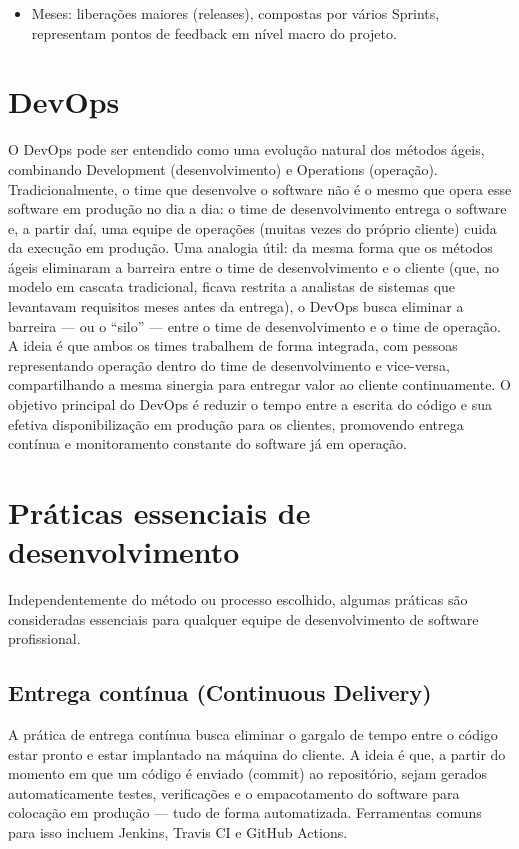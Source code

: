 \begin{itemize}
  \item Meses: liberações maiores (releases), compostas por vários Sprints, representam pontos de feedback em nível macro do projeto.
\end{itemize}

\section{DevOps}

O DevOps pode ser entendido como uma evolução natural dos métodos ágeis, combinando Development (desenvolvimento) e Operations (operação). Tradicionalmente, o time que desenvolve o software não é o mesmo que opera esse software em produção no dia a dia: o time de desenvolvimento entrega o software e, a partir daí, uma equipe de operações (muitas vezes do próprio cliente) cuida da execução em produção. Uma analogia útil: da mesma forma que os métodos ágeis eliminaram a barreira entre o time de desenvolvimento e o cliente (que, no modelo em cascata tradicional, ficava restrita a analistas de sistemas que levantavam requisitos meses antes da entrega), o DevOps busca eliminar a barreira — ou o “silo” — entre o time de desenvolvimento e o time de operação. A ideia é que ambos os times trabalhem de forma integrada, com pessoas representando operação dentro do time de desenvolvimento e vice-versa, compartilhando a mesma sinergia para entregar valor ao cliente continuamente. O objetivo principal do DevOps é reduzir o tempo entre a escrita do código e sua efetiva disponibilização em produção para os clientes, promovendo entrega contínua e monitoramento constante do software já em operação.

\section{Práticas essenciais de desenvolvimento}

Independentemente do método ou processo escolhido, algumas práticas são consideradas essenciais para qualquer equipe de desenvolvimento de software profissional.

\subsection{Entrega contínua (Continuous Delivery)}

A prática de entrega contínua busca eliminar o gargalo de tempo entre o código estar pronto e estar implantado na máquina do cliente. A ideia é que, a partir do momento em que um código é enviado (commit) ao repositório, sejam gerados automaticamente testes, verificações e o empacotamento do software para colocação em produção — tudo de forma automatizada. Ferramentas comuns para isso incluem Jenkins, Travis CI e GitHub Actions.

